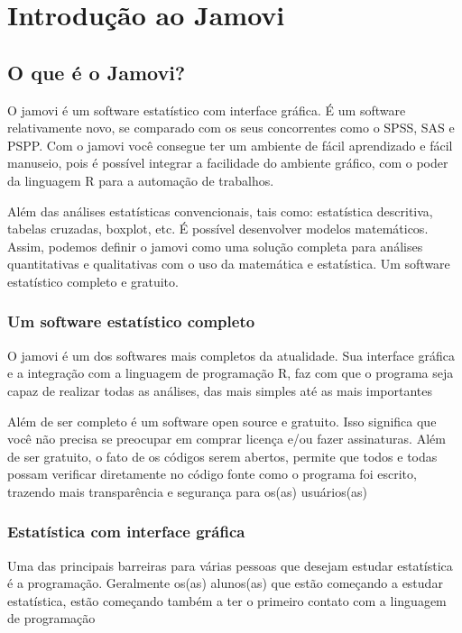 \chapter{Introdução ao Jamovi}

\section{O que é o Jamovi?}

O jamovi é um software estatístico com interface gráfica. É um software relativamente novo, se comparado com os seus concorrentes como o SPSS, SAS e PSPP. Com o jamovi você consegue ter um ambiente de fácil aprendizado e fácil manuseio, pois é possível integrar a facilidade do ambiente gráfico, com o poder da linguagem R para a automação de trabalhos.

Além das análises estatísticas convencionais, tais como: estatística descritiva, tabelas cruzadas, boxplot, etc. É possível desenvolver modelos matemáticos. Assim, podemos definir o jamovi como uma solução completa para análises quantitativas e qualitativas com o uso da matemática e estatística. Um software estatístico completo e gratuito.

\subsection{Um software estatístico completo}

O jamovi é um dos softwares mais completos da atualidade. Sua interface gráfica e a integração com a linguagem de programação R, faz com que o programa seja capaz de realizar todas as análises, das mais simples até as mais importantes

Além de ser completo é um software open source e gratuito. Isso significa que você não precisa se preocupar em comprar licença e/ou fazer assinaturas. Além de ser gratuito, o fato de os códigos serem abertos, permite que todos e todas possam verificar diretamente no código fonte como o programa foi escrito, trazendo mais transparência e segurança para os(as) usuários(as)

\subsection{Estatística com interface gráfica}

Uma das principais barreiras para várias pessoas que desejam estudar estatística é a programação. Geralmente os(as) alunos(as) que estão começando a estudar estatística, estão começando também a ter o primeiro contato com a linguagem de programação

